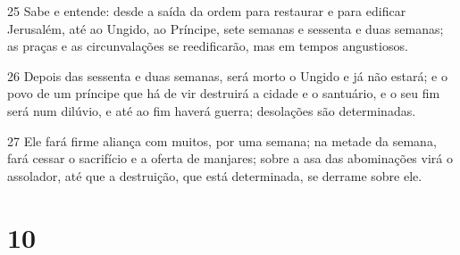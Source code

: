 \par 25 Sabe e entende: desde a saída da ordem para restaurar e para edificar Jerusalém, até ao Ungido, ao Príncipe, sete semanas e sessenta e duas semanas; as praças e as circunvalações se reedificarão, mas em tempos angustiosos.
\par 26 Depois das sessenta e duas semanas, será morto o Ungido e já não estará; e o povo de um príncipe que há de vir destruirá a cidade e o santuário, e o seu fim será num dilúvio, e até ao fim haverá guerra; desolações são determinadas.
\par 27 Ele fará firme aliança com muitos, por uma semana; na metade da semana, fará cessar o sacrifício e a oferta de manjares; sobre a asa das abominações virá o assolador, até que a destruição, que está determinada, se derrame sobre ele.

\chapter{10}

